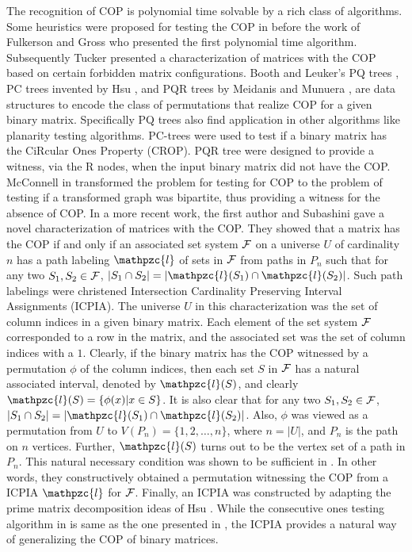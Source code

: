 \documentclass[envcountsect, envcountsame, 11pt]{../lib/llncs2e/llncs}
\def\cF{{\cal F}}
\def\cl{\mathpzc{l}}
\begin{document}
The recognition of COP is polynomial time solvable by
a rich class of algorithms. Some heuristics were proposed for testing the COP in \cite{wsr51} before the work of Fulkerson and Gross \cite{fg65} who presented the first polynomial time algorithm.   Subsequently Tucker \cite{at72}  presented a characterization of matrices with the COP
based on certain forbidden matrix configurations.  
Booth and Leuker's PQ trees \cite{bl76}, PC trees invented by Hsu \cite{wlh01,wlh02}, and PQR trees by Meidanis and
Munuera \cite{mm09},  are data structures to encode the class of
permutations that realize COP for a given binary matrix.  Specifically PQ trees
also find application in other algorithms like planarity testing algorithms.  
PC-trees were used to test if a binary matrix has the CiRcular Ones Property (CROP).   PQR tree were designed to provide a witness, via the R nodes, when the input binary matrix did not have the COP.  McConnell in \cite{mcc04} transformed the problem for testing for COP to the problem of testing if a transformed graph was bipartite, thus providing a witness for the absence of COP.    In a more recent work, the first author and Subashini \cite{nsnrs09} gave a novel characterization of matrices with the COP.  They showed that a matrix has the COP if and only if an associated set system $\cF$ on a universe $U$ of cardinality $n$ has a path labeling $\cl$ of sets in $\cF$ from paths in $P_n$ such that for any two $S_1, S_2 \in \cF$, $|S_1 \cap S_2| = |\cl(S_1) \cap \cl(S_2)|$.  Such path labelings were christened Intersection Cardinality Preserving Interval Assignments (ICPIA).   The universe $U$ in this characterization was the set of column indices in a given binary matrix.    Each element of the set system $\cF$ corresponded to a row in the matrix, and the associated set was the set of column indices with a $1$.    Clearly, if the binary matrix has the COP witnessed by a permutation $\phi$ of the column indices,  then each set $S$ in $\cF$ has a natural associated interval, denoted by $\cl(S)$, and clearly $\cl(S) = \{\phi(x) | x \in S\}$.   It is also clear  that for any two $S_1, S_2 \in \cF$, $|S_1 \cap S_2| = |\cl(S_1) \cap \cl(S_2)|$.   Also, $\phi$ was viewed as a permutation from $U$ to $V(P_n)=\{1, 2, \ldots, n\}$, where $n = |U|$, and $P_n$ is the path on $n$ vertices.   Further, $\cl(S)$ turns out to be the vertex set of a path in $P_n$.  This natural necessary condition was shown to be sufficient in \cite{nsnrs09}.  In other words, they constructively obtained a permutation witnessing the COP from a ICPIA $\cl$ for $\cF$.   Finally, an ICPIA was constructed by adapting the prime matrix decomposition ideas of Hsu \cite{wlh02}.   While the consecutive ones testing algorithm in \cite{nsnrs09} is same as the one presented in
\cite{wlh02}, the ICPIA provides a natural way of generalizing the COP of binary matrices.
\end{document}

